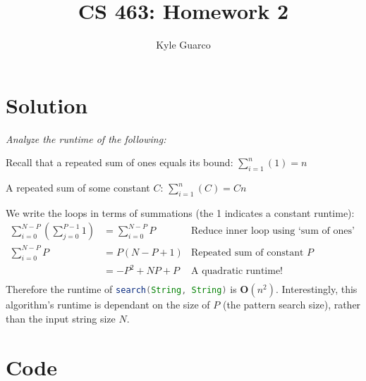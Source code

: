 \documentclass{article}
\author{Kyle Guarco}
\title{CS 463: Homework 2}
\begin{document}
\maketitle
\section{Solution}
\textit{Analyze the runtime of the following:}


\begin{tcolorbox}
	\centering
	Recall that a repeated sum of ones equals its bound: $\sum_{i = 1}^{n}(1) = n$

	A repeated sum of some constant $C$: $\sum_{i = 1}^{n}(C) = Cn$
\end{tcolorbox}

\noindent We write the loops in terms of summations (the 1 indicates a constant runtime):
\begin{align*}
	\sum_{i = 0}^{N - P}\left( \sum_{j = 0}^{P - 1}{1} \right) &= \sum_{i = 0}^{N - P}{P}  &\mbox{Reduce inner loop using `sum of ones' formula}\\
	\sum_{i = 0}^{N - P}{P} &= P(N - P + 1) &\mbox{Repeated sum of constant $P$}\\
	&= -P^2 + NP + P &\mbox{A quadratic runtime!}\\
\end{align*}
Therefore the runtime of \lstinline[language=Java]{search(String, String)} is $\mathbf{O}(n^2)$. Interestingly, this
algorithm's runtime is dependant on the size of $P$ (the pattern search size), rather than the input string size $N$.

\newpage
\section{Code}

\end{document}
